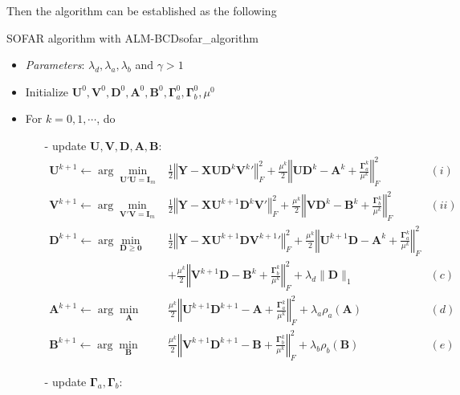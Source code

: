 \documentclass[twoside]{article}
\begin{document}
Then the algorithm can be established as the following
\begin{algorithm}{SOFAR algorithm with ALM-BCD}{sofar_algorithm}
    \begin{itemize}
        \item \textit{Parameters}: $\lambda_d,\lambda_a,\lambda_b$ and $\gamma >1$
        \item Initialize $\mathbf{U}^0,\mathbf{V}^0,\mathbf{D}^0,\mathbf{A}^0,\mathbf{B}^0,\boldsymbol{\Gamma}^0_a,\boldsymbol{\Gamma}^0_b,\mu^0$
        \item For $k=0,1,\cdots$, do 
        \begin{itemize}
            \item[-] update $\mathbf{U,V,D,A,B}$:
            \begin{align*}
                \mathbf{U}^{k+1} \leftarrow \arg\min_{\mathbf{U'U=I}_m} & \frac{1}{2}\left\Vert \mathbf{Y-XUD}^k{\mathbf{V}^k}' \right\Vert ^2_F + \frac{\mu^k}{2}\left\Vert \mathbf{UD}^k-\mathbf{A}^k + \frac{\boldsymbol{\Gamma}^k_a}{\mu^k} \right\Vert ^2_F & (i)\\
                \mathbf{V}^{k+1} \leftarrow \arg\min_{\mathbf{V'V=I}_m} &\frac{1}{2}\left\Vert \mathbf{Y-XU}^{k+1}\mathbf{D}^k{\mathbf{V}}' \right\Vert ^2_F + \frac{\mu^k}{2}\left\Vert \mathbf{VD}^k-\mathbf{B}^k + \frac{\boldsymbol{\Gamma}^k_b}{\mu^k} \right\Vert ^2_F & (ii)\\
                \mathbf{D}^{k+1} \leftarrow \arg\min_{\mathbf{D}\geq \mathbf{0}} &\frac{1}{2}\left\Vert \mathbf{Y-XU}^{k+1}\mathbf{D}{\mathbf{V}^{k+1}}' \right\Vert ^2_F + \frac{\mu^k}{2}\left\Vert \mathbf{U}^{k+1}\mathbf{D}-\mathbf{A}^k + \frac{\boldsymbol{\Gamma}^k_a}{\mu^k} \right\Vert ^2_F \\
                &+\frac{\mu^k}{2}\left\Vert \mathbf{V}^{k+1}\mathbf{D}-\mathbf{B}^k + \frac{\boldsymbol{\Gamma}^k_b}{\mu^k} \right\Vert ^2_F + \lambda_d \lVert \mathbf{D} \rVert _1 & (c)\\
                \mathbf{A}^{k+1}\leftarrow \arg\min_{\mathbf{A}} &\frac{\mu^k}{2}\left\Vert \mathbf{U}^{k+1}\mathbf{D}^{k+1}-\mathbf{A} + \frac{\boldsymbol{\Gamma}^k_a}{\mu^k} \right\Vert ^2_F + \lambda_a\rho_a(\mathbf{A}) & (d)\\
                \mathbf{B}^{k+1}\leftarrow \arg\min_{\mathbf{B}} &\frac{\mu^k}{2}\left\Vert \mathbf{V}^{k+1}\mathbf{D}^{k+1}-\mathbf{B} + \frac{\boldsymbol{\Gamma}^k_b}{\mu^k} \right\Vert ^2_F + \lambda_b\rho_b(\mathbf{B}) & (e)
            \end{align*} 
            \item[-] update $\boldsymbol{\Gamma}_a,\boldsymbol{\Gamma}_b$:

\end{itemize}
\end{itemize}
\end{algorithm}
\end{document}
